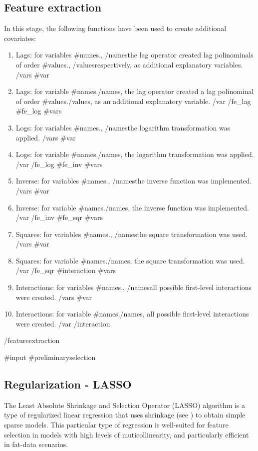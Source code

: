 \documentclass{article}
\begin{document}
\subsection{Feature extraction}

In this stage, the following functions have been used to create additional covariates:  

\begin{enumerate}
  {{#fe_lag}}
    {{#vars}}
    \item Lags: for variables {{#names}}{{{.}}}, {{/names}}the lag operator created lag polinominals of order {{#values}}{{{.}}}, {{/values}}respectively, as additional explanatory variables.
    {{/vars}}
    {{#var}}
    \item Lags: for variable {{#names}}{{.}}{{/names}}, the lag operator created a lag polinominal of order {{#values}}{{.}}{{/values}}, as an additional explanatory variable.
    {{/var}}
  {{/fe_lag}}
  {{#fe_log}}
    {{#vars}}
    \item Logs: for variables {{#names}}{{.}}, {{/names}}the logarithm transformation was applied.
    {{/vars}}
    {{#var}}
    \item Logs: for variable {{#names}}{{.}}{{/names}}, the logarithm transformation was applied.
    {{/var}}
  {{/fe_log}}
  {{#fe_inv}}
    {{#vars}}
    \item Inverse: for variables {{#names}}{{.}}, {{/names}}the inverse function was implemented.
    {{/vars}}
    {{#var}}
    \item Inverse: for variable {{#names}}{{.}}{{/names}}, the inverse function was implemented.
    {{/var}}
  {{/fe_inv}}
  {{#fe_sqr}}
    {{#vars}}
    \item Squares: for variables {{#names}}{{.}}, {{/names}}the square transformation was used.
    {{/vars}}
    {{#var}}
    \item Squares: for variable {{#names}}{{.}}{{/names}}, the square transformation was used.
    {{/var}}
  {{/fe_sqr}} 
  {{#interaction}}
    {{#vars}}
    \item Interactions: for variables {{#names}}{{.}}, {{/names}}all possible first-level interactions were created.
    {{/vars}}
    {{#var}}
    \item Interactions: for variable {{#names}}{{.}}{{/names}}, all possible first-level interactions were created.
    {{/var}}
  {{/interaction}}
\end{enumerate}
{{/featureextraction}}

{{#input}}
{{#preliminaryselection}}
\subsection{Regularization - LASSO}
The Least Absolute Shrinkage and Selection Operator (LASSO) algorithm is a type of regularized linear regression that uses shrinkage (see \cite{tibshirani1996}) to obtain simple sparse models. This particular type of regression is well-suited for feature selection in models with high levels of muticollinearity, and particularly efficient in fat-data scenarios.
\end{document}
